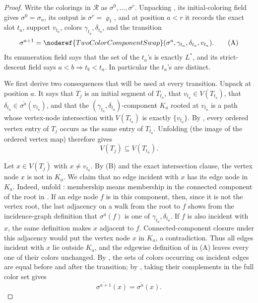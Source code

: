 \begin{proof}
Write the colorings in \(\mathcal R\) as
\(\sigma^0,\ldots,\sigma^r\).  Unpacking
, its initial-coloring field gives
\(\sigma^0=\sigma_n\), its output is
\(\sigma^r=\varrho_1\), and at position \(a<r\) it records the exact
slot \(t_a\), support \(v_{t_a}\), colors
\(\gamma_{t_a},\delta_{t_a}\), and the transition
\[
 \sigma^{a+1}=
 \noderef{TwoColorComponentSwap}
   (\sigma^a,\gamma_{t_a},\delta_{t_a},v_{t_a}).                \tag{A}
\]
Its enumeration field says that the set of the \(t_a\)'s is exactly
\(L^*\), and its strict-descent field says
\(a<b\Rightarrow t_b<t_a\).  In particular the \(t_a\)'s are distinct.

We first derive two consequences that will be used at every transition.
Unpack  at position \(a\).
It says that \(T_j\) is an initial segment of \(T_{t_a}\), that
\(v_{t_a}\in V(T_{t_a})\), that
\(\delta_{t_a}\in\overline{\sigma^a}(v_{t_a})\), and that the
\((\gamma_{t_a},\delta_{t_a})\)-component \(K_a\) rooted at
\(v_{t_a}\) is a path whose vertex-node intersection with
\(V(T_{t_a})\) is exactly \(\{v_{t_a}\}\).
By , every ordered vertex entry of
\(T_j\) occurs as the same entry of \(T_{t_a}\).  Unfolding
 (the image of the ordered vertex map)
therefore gives
\[
                         V(T_j)\subseteq V(T_{t_a}).            \tag{B}
\]

Let \(x\in V(T_j)\) with \(x\ne v_{t_a}\).  By (B) and the exact
intersection clause, the vertex node \(x\) is not in \(K_a\).  We claim
that no edge incident with \(x\) has its edge node in \(K_a\).  Indeed,
unfold : membership means membership in the
connected component of the root in
.  If an edge node \(f\) is in this
component, then, since it is not the vertex root, the last adjacency on
a walk from the root to \(f\) shows from the incidence-graph definition
that \(\sigma^a(f)\) is one of
\(\gamma_{t_a},\delta_{t_a}\).  If \(f\) is also incident with \(x\),
the same definition makes \(x\) adjacent to \(f\).  Connected-component
closure under this adjacency would put the vertex node \(x\) in \(K_a\),
a contradiction.  Thus all edges incident with \(x\) lie outside
\(K_a\), and the edgewise definition of
 in (A) leaves every one of their colors
unchanged.  By , the sets of colors occurring on
incident edges are equal before and after the transition; by
, taking their complements in the full color set
gives
\[
              \overline{\sigma^{a+1}}(x)
                    =\overline{\sigma^a}(x).                  \tag{C}
\]


\end{proof}
